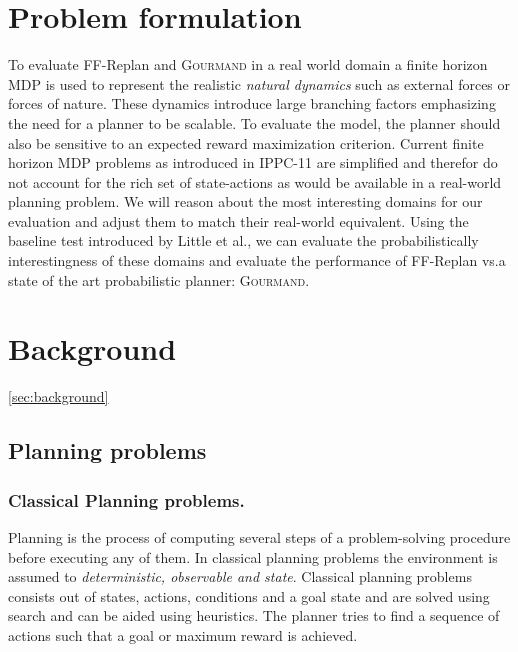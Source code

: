 \documentclass[runningheads,a4paper]{llncs}
\begin{document}

\section{Problem formulation}

To evaluate FF-Replan and \textsc{Gourmand} in a real world domain a finite horizon MDP is used to represent the realistic \emph{natural dynamics} such as external forces or forces of nature. These dynamics introduce large branching factors emphasizing the need for a planner to be scalable. To evaluate the model, the planner should also be sensitive to an expected reward maximization criterion.
Current finite horizon MDP problems as introduced in IPPC-11 are simplified and therefor do not account for the rich set of state-actions as would be available in a real-world planning problem. We will reason about the most interesting domains for our evaluation and adjust them to match their real-world equivalent. Using the baseline test introduced by Little et al.\@ \cite{little2007probvsreplan}, we can evaluate the probabilistically interestingness of these domains and evaluate the performance of FF-Replan vs.\@ a state of the art probabilistic planner: \textsc{Gourmand}.




\section{Background}
\ref{sec:background}

\subsection{Planning problems}
\subsubsection{Classical Planning problems. } Planning is the process of computing several steps of a problem-solving procedure before executing any of them. In classical planning problems the environment is assumed to \emph{deterministic, observable and state}. Classical planning problems consists out of states, actions, conditions and a goal state and are solved using search and can be aided using heuristics. The planner tries to find a sequence of actions such that a goal or maximum reward is achieved.
\end{document}
